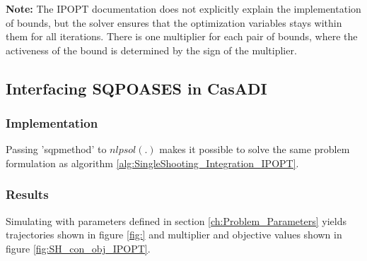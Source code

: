 \textbf{Note:} The IPOPT documentation does not explicitly explain the implementation of bounds, but the solver ensures that the optimization variables stays within them for all iterations. There is one multiplier for each pair of bounds, where the activeness of the bound is determined by the sign of the multiplier.

\subsection{Interfacing SQPOASES in CasADI}
\subsubsection{Implementation}
Passing 'sqpmethod' to $nlpsol(.)$ makes it possible to solve the same problem formulation as algorithm \ref{alg:SingleShooting_Integration_IPOPT}.

\subsubsection{Results}
Simulating with parameters defined in section \ref{ch:Problem_Parameters} yields trajectories shown in figure \ref{fig:} and multiplier and objective values shown in figure \ref{fig:SH_con_obj_IPOPT}.